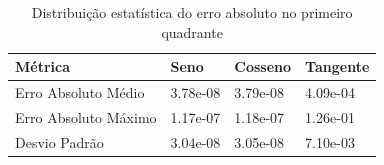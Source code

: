 \begin{table}
\caption{Distribuição estatística do erro absoluto no primeiro quadrante}
\label{tab:estatistica}
\begin{tabular}{llll}
\toprule
Métrica & Seno & Cosseno & Tangente \\
\midrule
Erro Absoluto Médio & 3.78e-08 & 3.79e-08 & 4.09e-04 \\
Erro Absoluto Máximo & 1.17e-07 & 1.18e-07 & 1.26e-01 \\
Desvio Padrão & 3.04e-08 & 3.05e-08 & 7.10e-03 \\
\bottomrule
\end{tabular}
\end{table}
